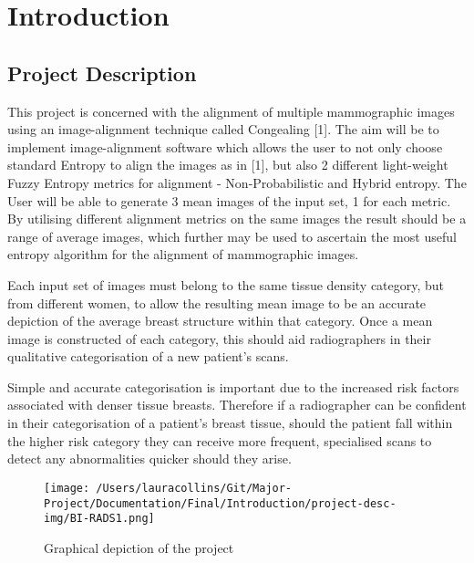\chapter{Introduction}

\section{Project Description}
This project is concerned with the alignment of multiple mammographic images using an image-alignment technique called Congealing [1]. The aim will be to implement image-alignment software which allows the user to not only choose standard Entropy to align the images as in [1], but also 2 different light-weight Fuzzy Entropy metrics for alignment - Non-Probabilistic and Hybrid entropy. The User will be able to generate 3 mean images of the input set, 1 for each metric. By utilising different alignment metrics on the same images the result should be a range of average images, which further may be used to ascertain the most useful entropy algorithm for the alignment of mammographic images.

Each input set of images must belong to the same tissue density category, but from different women, to allow the resulting mean image to be an accurate depiction of the average breast structure within that category. Once a mean image is constructed of each category, this should aid radiographers in their qualitative categorisation of a new patient's scans.

Simple and accurate categorisation is important due to the increased risk factors associated with denser tissue breasts. Therefore if a radiographer can be confident in their categorisation of a patient's breast tissue, should the patient fall within the higher risk category they can receive more frequent, specialised scans to detect any abnormalities quicker should they arise.

\begin{figure}[H]
  \center
  \texttt{[image: /Users/lauracollins/Git/Major-Project/Documentation/Final/Introduction/project-desc-img/BI-RADS1.png]}
  \caption{Graphical depiction of the project}
  \label{fig:project-desc-img}
\end{figure}
